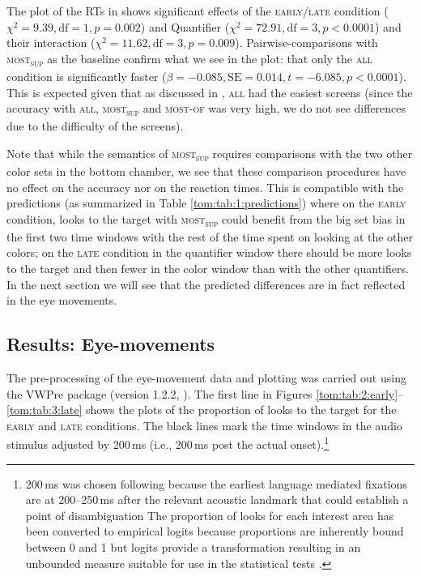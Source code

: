 \documentclass[output=paper]{langscibook}
\begin{document}
The plot of the RTs in  shows significant effects of the \textsc{early}/\textsc{late} condition ($\chi^2=9.39,
\text{df}=1, p=0.002$) and Quantifier ($\chi^2=72.91, \text{df}=3, p<0.0001$) and their
interaction ($\chi^2=11.62, \text{df}=3, p=0.009$). Pairwise-comparisons with
\textsc{most\textsubscript{sup}} as the baseline confirm what we see in the plot: that only the \textsc{all}
condition is significantly faster ($\beta =-0.085, \text{SE}=0.014, t=-6.085,\allowbreak p<0.0001$). This is
expected given that as discussed in , \textsc{all} had the easiest screens (since the accuracy with
\textsc{all}, \textsc{most\textsubscript{sup}} and \textsc{most-of} was very high, we do not see differences due to the difficulty of the screens).

Note that while the semantics of \textsc{most\textsubscript{sup}} requires comparisons with the two other color sets in the bottom chamber, we see that these comparison procedures have no effect on the accuracy nor on the reaction times. This is compatible with the predictions (as summarized in Table \ref{tom:tab:1:predictions}) where on the \textsc{early} condition, looks to the
target with \textsc{most\textsubscript{sup}} could benefit from the big set bias in the first two time windows
with the rest of the time spent on looking at the other colors; on the \textsc{late} condition in the quantifier window there
should be more looks to the target and then fewer in the color window than with the other quantifiers. In the next
section we will see that the predicted differences are in fact reflected in the eye movements.



\subsection{Results: Eye-movements} 

The pre-processing of the eye-movement data and plotting was carried out using the VWPre package (version 1.2.2,
\citealt{Porretta}). The first line in Figures \ref{tom:tab:2:early}--\ref{tom:tab:3:late} shows the plots of the proportion of looks to the target for the \textsc{early} and \textsc{late}
conditions. The black lines mark the time windows in the audio stimulus adjusted by 200\,ms (i.e., 200\,ms post the
actual onset).\footnote{\textrm{200\,ms was chosen following \citet{degen2016availability} because the earliest language
mediated fixations are at 200--250\,ms after the relevant acoustic landmark that could establish a point of
disambiguation \citep{salverda2014immediate}} The proportion of looks for each interest area has been
converted to empirical logits because proportions are inherently bound between 0 and 1 but logits provide a
transformation resulting in an unbounded measure suitable for use in the statistical tests \citep{barr2008analyzing}.}
\end{document}
